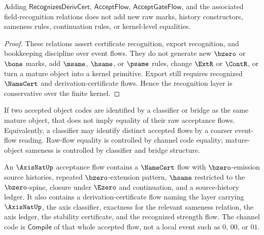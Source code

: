 \begin{theorem}
\label{thm:derivcert-generated-conservativity}
Adding $\mathsf{RecognizesDerivCert}$, $\mathsf{AcceptFlow}$, $\mathsf{AcceptGateFlow}$, and the associated field-recognition relations does not add new raw marks, history constructors, sameness rules, continuation rules, or kernel-level equalities.
\end{theorem}

\begin{proof}
These relations assert certificate recognition, export recognition, and bookkeeping discipline over event flows. They do not generate new $\bzero$ or $\bone$ marks, add $\msame$, $\hsame$, or $\psame$ rules, change $\ExtR$ or $\ContR$, or turn a mature object into a kernel primitive. Export still requires recognized $\NameCert$ and derivation-certificate flows. Hence the recognition layer is conservative over the finite kernel.
\end{proof}

\begin{corollary}
\label{cor:derivcert-generated-code-weaker-than-object-equality}
If two accepted object codes are identified by a classifier or bridge as the same mature object, that does not imply equality of their raw acceptance flows. Equivalently, a classifier may identify distinct accepted flows by a coarser event-flow reading. Raw-flow equality is controlled by channel code equality; mature-object sameness is controlled by classifier and bridge structure.
\end{corollary}

\begin{example}
\label{ex:derivcert-generated-axis-acceptance-flow}
An $\AxisNatUp$ acceptance flow contains a $\NameCert$ flow with $\bzero$-emission source histories, repeated $\bzero$-extension pattern, $\hsame$ restricted to the $\bzero$-spine, closure under $\Ezero$ and continuation, and a source-history ledger. It also contains a derivation-certificate flow naming the layer carrying $\AxisNatUp$, the axis classifier, exactness for the relevant sameness relation, the axis ledger, the stability certificate, and the recognized strength flow. The channel code is $\mathsf{Compile}$ of that whole accepted flow, not a local event such as $0$, $00$, or $01$.
\end{example}

